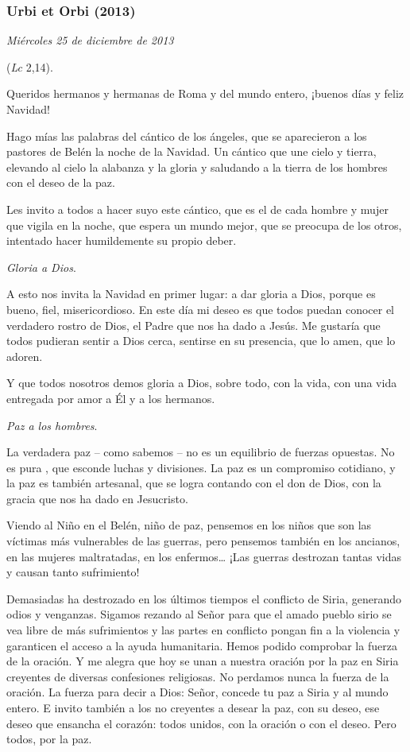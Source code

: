 \begin{body}
\begin{body}
\subsubsection{Urbi et Orbi (2013)} \emph{Miércoles 25 de diciembre de 2013}


\emph{} (\emph{Lc} 2,14).

Queridos hermanos y hermanas de Roma y del mundo entero, ¡buenos días y feliz Navidad!

Hago mías las palabras del cántico de los ángeles, que se aparecieron a los pastores de Belén la noche de la Navidad. Un cántico que une cielo y tierra, elevando al cielo la alabanza y la gloria y saludando a la tierra de los hombres con el deseo de la paz.

Les invito a todos a hacer suyo este cántico, que es el de cada hombre y mujer que vigila en la noche, que espera un mundo mejor, que se preocupa de los otros, intentado hacer humildemente su propio deber.

\emph{Gloria a Dios}.

A esto nos invita la Navidad en primer lugar: a dar gloria a Dios, porque es bueno, fiel, misericordioso. En este día mi deseo es que todos puedan conocer el verdadero rostro de Dios, el Padre que nos ha dado a Jesús. Me gustaría que todos pudieran sentir a Dios cerca, sentirse en su presencia, que lo amen, que lo adoren.

Y que todos nosotros demos gloria a Dios, sobre todo, con la vida, con una vida entregada por amor a Él y a los hermanos.

\emph{Paz a los hombres}.

La verdadera paz -- como sabemos -- no es un equilibrio de fuerzas opuestas. No es pura , que esconde luchas y divisiones. La paz es un compromiso cotidiano, y la paz es también artesanal, que se logra contando con el don de Dios, con la gracia que nos ha dado en Jesucristo.

Viendo al Niño en el Belén, niño de paz, pensemos en los niños que son las víctimas más vulnerables de las guerras, pero pensemos también en los ancianos, en las mujeres maltratadas, en los enfermos\ldots{} ¡Las guerras destrozan tantas vidas y causan tanto sufrimiento!

Demasiadas ha destrozado en los últimos tiempos el conflicto de Siria, generando odios y venganzas. Sigamos rezando al Señor para que el amado pueblo sirio se vea libre de más sufrimientos y las partes en conflicto pongan fin a la violencia y garanticen el acceso a la ayuda humanitaria. Hemos podido comprobar la fuerza de la oración. Y me alegra que hoy se unan a nuestra oración por la paz en Siria creyentes de diversas confesiones religiosas. No perdamos nunca la fuerza de la oración. La fuerza para decir a Dios: Señor, concede tu paz a Siria y al mundo entero. E invito también a los no creyentes a desear la paz, con su deseo, ese deseo que ensancha el corazón: todos unidos, con la oración o con el deseo. Pero todos, por la paz.


\end{body}
\end{body}
